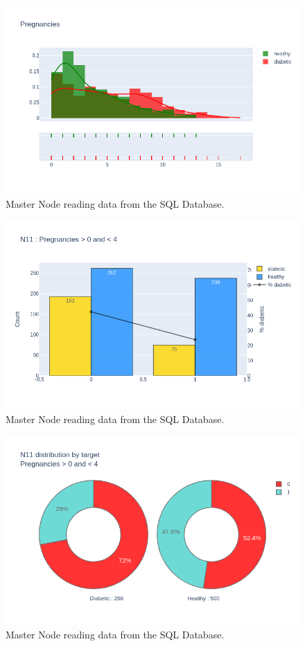 \documentclass[12pt]{article}
\begin{document}
\begin{figure}[ht]
\centering
\includegraphics[width=1\textwidth]{newplot(36).png}
\caption{Master Node reading data from the SQL Database.}
\end{figure}

\begin{figure}[ht]
\centering
\includegraphics[width=1\textwidth]{newplot(37).png}
\caption{Master Node reading data from the SQL Database.}
\end{figure}

\begin{figure}[ht]
\centering
\includegraphics[width=1\textwidth]{newplot(38).png}
\caption{Master Node reading data from the SQL Database.}
\end{figure}
\end{document}

